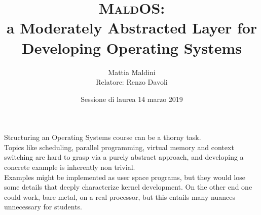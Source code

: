 \documentclass[table,xcdraw]{beamer}
\begin{document}
\title[MaldOS]
{{\huge\textsc{MaldOS}:} \\
a Moderately Abstracted Layer for Developing Operating Systems}
\author[Mattia Maldini]
{Mattia Maldini\\[3mm]Relatore: Renzo Davoli\\[3mm]}

\date[Laurea 2019]
{Sessione di laurea 14 marzo 2019}
\subject{Informatica}

\frame{\titlepage}

\begin{frame}[fragile]
    Structuring an Operating Systems course can be a thorny task. \\
    \bigskip
    Topics like scheduling, parallel programming, virtual memory and context switching are 
    hard to grasp via a purely abstract approach, and developing a concrete 
    example is inherently non trivial.\\
    \bigskip
    Examples might be implemented as user space programs, but they would lose
    some details that deeply characterize kernel development. On the other end
    one could work, bare metal, on a real processor, but this entails many 
     nuances unnecessary for students.

\end{frame}
\end{document}
